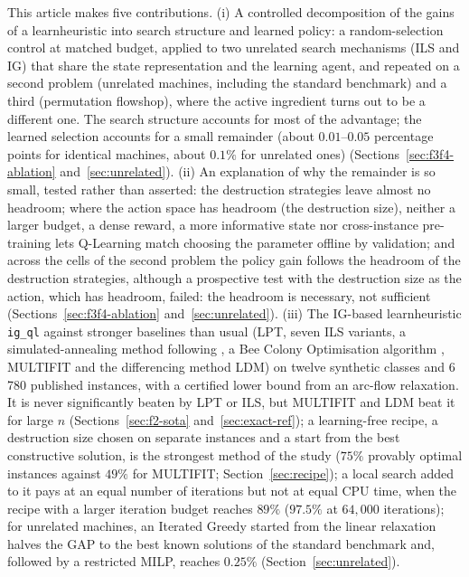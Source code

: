 \documentclass[final,3p,times,11pt,authoryear]{elsarticle}
\begin{document}
This article makes five contributions.
(i) A controlled decomposition of the gains of a learnheuristic into search
structure and learned policy: a random-selection control at matched budget,
applied to two unrelated search mechanisms (ILS and IG) that share the state
representation and the learning agent, and repeated on a second problem
(unrelated machines, including the standard benchmark) and a third (permutation flowshop), where the active ingredient turns out to be a different one. The search structure accounts for most of the advantage;
the learned selection accounts for a small remainder (about $0.01$--$0.05$
percentage points for identical machines, about $0.1\%$ for unrelated ones)
(Sections~\ref{sec:f3f4-ablation} and~\ref{sec:unrelated}).
(ii) An explanation of why the remainder is so small, tested rather than
asserted: the destruction strategies leave almost no headroom; where the action
space has headroom (the destruction size), neither a larger budget, a dense
reward, a more informative state nor cross-instance pre-training lets
Q-Learning match choosing the parameter offline by validation; and across the
cells of the second problem the policy gain follows the headroom of the destruction strategies, although a prospective test with the
destruction size as the action, which has headroom, failed: the headroom is necessary, not sufficient
(Sections~\ref{sec:f3f4-ablation} and~\ref{sec:unrelated}).
(iii) The IG-based learnheuristic \texttt{ig\_ql} against stronger baselines
than usual (LPT, seven ILS variants, a simulated-annealing method following
\citet{LiPerkins2024}, a Bee Colony Optimisation algorithm
\citep{DavidovicEtal2012}, MULTIFIT and the differencing method LDM) on twelve
synthetic classes and 6\,780 published instances, with a certified lower bound
from an arc-flow relaxation. It is never significantly beaten by LPT or ILS, but
MULTIFIT and LDM beat it for large $n$ (Sections~\ref{sec:f2-sota} and~\ref{sec:exact-ref}); a learning-free
recipe, a destruction size chosen on separate instances and a start from the best
constructive solution, is the strongest method of the study ($75\%$ provably
optimal instances against $49\%$ for MULTIFIT; Section~\ref{sec:recipe}); a local
search added to it pays at an equal number of iterations but not at equal CPU
time, when the recipe with a larger iteration budget reaches $89\%$ ($97.5\%$ at $64{,}000$ iterations); for unrelated machines, an Iterated Greedy started from the
linear relaxation halves the GAP to the best known solutions of the standard benchmark and, followed by a restricted MILP, reaches $0.25\%$ (Section~\ref{sec:unrelated}).
\end{document}
